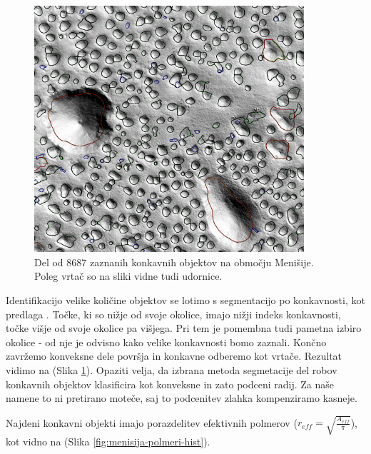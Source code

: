\documentclass[a4paper, twoside, 12pt]{book}
\begin{document}
        \begin{figure}[h]
          \begin{center}
            \includegraphics[width=10cm]{slike/menisija-vrtace}
          \end{center}
          \caption{Del od 8687 zaznanih konkavnih objektov na območju Menišije. Poleg vrtač so na sliki vidne tudi udornice.}
          \label{fig:menisija-vrtace}
        \end{figure}

        Identifikacijo velike količine objektov se lotimo s segmentacijo po konkavnosti, kot predlaga \cite{doctor13}. Točke, ki so nižje od svoje okolice, imajo nižji indeks konkavnosti, točke višje od svoje okolice pa višjega. Pri tem je pomembna tudi pametna izbiro okolice - od nje je odvisno kako velike konkavnosti bomo zaznali. Končno zavržemo konveksne dele površja in konkavne odberemo kot vrtače. Rezultat vidimo na (Slika \ref{fig:menisija-vrtace}). Opaziti velja, da izbrana metoda segmetacije del robov konkavnih objektov klasificira kot konveksne in zato podceni radij. Za naše namene to ni pretirano moteče, saj to podcenitev zlahka kompenziramo kasneje.

        Najdeni konkavni objekti imajo porazdelitev efektivnih polmerov \newline (\mbox{$r_{eff}=\sqrt{\frac{A_{eff}}{\pi}}$}), kot vidno na (Slika \ref{fig:menisija-polmeri-hist}).
\end{document}
